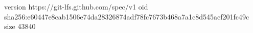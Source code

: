 version https://git-lfs.github.com/spec/v1
oid sha256:e60447e8cab1506e74da28326874adf78fc7673b468a7a1c8d545acf201fc49c
size 43840
